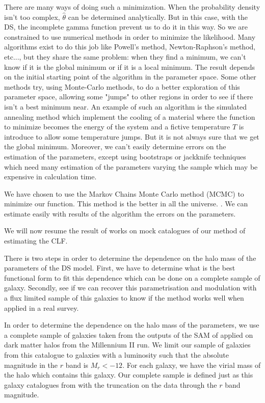 There are many ways of doing such a minimization. When the probability density isn't too complex, $\hat{\theta}$ can be determined
analytically. But in this case, with the DS, the incomplete gamma function prevent us to do it in this way. So we are constrained to
use numerical methods in order to minimize the likelihood. Many algorithms exist to do this job like Powell's method,
Newton-Raphson's method, etc..., but they share the same problem: when they find a minimum, we can't know if it is the global
minimum or if it is a local minimum. The result depends on the initial starting point of the algorithm in the parameter space. Some
other methods try, using Monte-Carlo methods, to do a better exploration of this parameter space, allowing some "jumps" to other
regions in order to see if there isn't a best minimum near. An example of such an algorithm is the simulated annealing method which
implement the cooling of a material where the function to minimize becomes the energy of the system and a fictive temperature $T$ is
introduce to allow some temperature jumps. But it is not always sure that we get the global minimum. Moreover, we can't easily
determine errors on the estimation of the parameters, except using bootstraps or jackknife techniques which need many estimation
of the parameters varying the sample which may be expensive in calculation time.

We have chosen to use the Markov Chains Monte Carlo method (MCMC) to minimize our function. This method is the better in all the
universe. . We can estimate easily with results of the algorithm the errors on the parameters.

We will now resume the result of works on mock catalogues of our method of estimating the CLF.

There is two steps in order to determine the dependence on the halo mass of the parameters of the DS model. First, we have to
determine what is the best functional form to fit this dependence which can be done on a complete sample of galaxy. Secondly, see if
we can recover this parametrisation and modulation with a flux limited sample of this galaxies to know if the method works well when
applied in a real survey.

In order to determine the dependence on the halo mass of the parameters, we use a complete sample of galaxies taken from the outputs
of the SAM of \citet{Guo+11} applied on dark matter halos from the Millennium II run. We limit our sample of galaxies from this
catalogue to galaxies with a luminosity such that the absolute magnitude in the $r$ band is $M_r<-12$. For each galaxy, we have the
virial mass of the halo which contains this galaxy. Our complete sample is defined just as this galaxy catalogues from
\citet{Guo+11} with the truncation on the data through the $r$ band magnitude.

